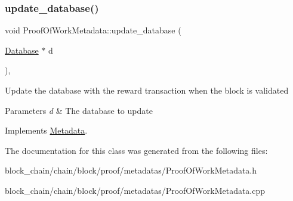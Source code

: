 \subsubsection{\texorpdfstring{update\+\_\+database()}{update\_database()}}
{\footnotesize\ttfamily void Proof\+Of\+Work\+Metadata\+::update\+\_\+database (\begin{DoxyParamCaption}\item[{\mbox{\hyperlink{classDatabase}{Database}} $\ast$}]{d }\end{DoxyParamCaption})\hspace{0.3cm}{\ttfamily [override]}, {\ttfamily [virtual]}}

Update the database with the reward transaction when the block is validated


\begin{DoxyParams}{Parameters}
{\em d} & The database to update \\
\hline
\end{DoxyParams}


Implements \mbox{\hyperlink{classMetadata_a501ab1977aac6a75f92309284e17de30}{Metadata}}.



The documentation for this class was generated from the following files\+:\begin{DoxyCompactItemize}
\item 
block\+\_\+chain/chain/block/proof/metadatas/Proof\+Of\+Work\+Metadata.\+h\item 
block\+\_\+chain/chain/block/proof/metadatas/Proof\+Of\+Work\+Metadata.\+cpp\end{DoxyCompactItemize}
